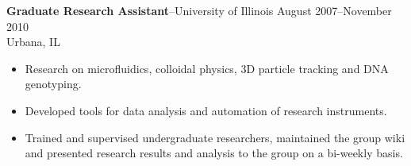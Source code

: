 \documentclass[10pt]{article}
\newcommand{\jobitem}[4]{
    \vspace{4pt}

    \textbf{#1}--#2 \hfill #3\\ #4

    \vspace{-8pt}
}
\begin{document}
\jobitem{Graduate Research Assistant}{University of Illinois}{August 2007--November 2010}{Urbana, IL}

\begin{itemize}\setlength{\itemsep}{0cm}
  \setlength{\parskip}{0cm}

\item Research on microfluidics, colloidal physics, 3D particle tracking and DNA genotyping.





\item Developed tools for data analysis and automation of research instruments.

\item Trained and supervised undergraduate researchers, maintained the group wiki and presented research results and analysis
to the group on a bi-weekly basis.







\end{itemize}
\end{document}

